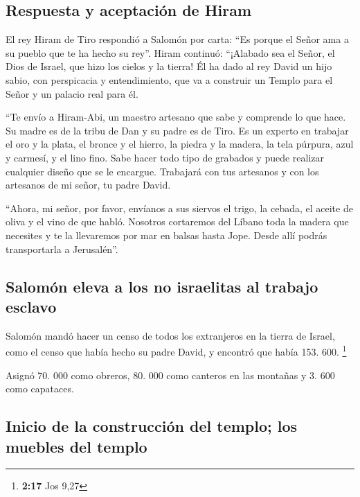 \hypertarget{respuesta-y-aceptaciuxf3n-de-hiram}{%
\subsection{Respuesta y aceptación de
Hiram}\label{respuesta-y-aceptaciuxf3n-de-hiram}}

 El rey Hiram de Tiro respondió a Salomón por carta: ``Es
porque el Señor ama a su pueblo que te ha hecho su rey''.
 Hiram continuó: ``¡Alabado sea el Señor, el Dios de
Israel, que hizo los cielos y la tierra! Él ha dado al rey David un hijo
sabio, con perspicacia y entendimiento, que va a construir un Templo
para el Señor y un palacio real para él.

 ``Te envío a Hiram-Abi, un maestro artesano que sabe y
comprende lo que hace.  Su madre es de la tribu de Dan y
su padre es de Tiro. Es un experto en trabajar el oro y la plata, el
bronce y el hierro, la piedra y la madera, la tela púrpura, azul y
carmesí, y el lino fino. Sabe hacer todo tipo de grabados y puede
realizar cualquier diseño que se le encargue. Trabajará con tus
artesanos y con los artesanos de mi señor, tu padre David.

 ``Ahora, mi señor, por favor, envíanos a sus siervos el
trigo, la cebada, el aceite de oliva y el vino de que habló.
 Nosotros cortaremos del Líbano toda la madera que
necesites y te la llevaremos por mar en balsas hasta Jope. Desde allí
podrás transportarla a Jerusalén''.

\hypertarget{salomuxf3n-eleva-a-los-no-israelitas-al-trabajo-esclavo}{%
\subsection{Salomón eleva a los no israelitas al trabajo
esclavo}\label{salomuxf3n-eleva-a-los-no-israelitas-al-trabajo-esclavo}}

 Salomón mandó hacer un censo de todos los extranjeros en
la tierra de Israel, como el censo que había hecho su padre David, y
encontró que había 153. 600. \footnote{\textbf{2:17} Jos 9,27}

 Asignó 70. 000 como obreros, 80. 000 como canteros en
las montañas y 3. 600 como capataces.

\hypertarget{inicio-de-la-construcciuxf3n-del-templo-los-muebles-del-templo}{%
\subsection{Inicio de la construcción del templo; los muebles del
templo}\label{inicio-de-la-construcciuxf3n-del-templo-los-muebles-del-templo}}

